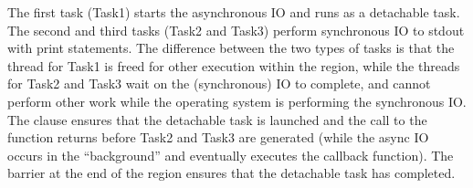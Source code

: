 The first task (Task1) starts the asynchronous IO and runs as a detachable task.
The second and third tasks (Task2 and Task3) perform synchronous IO to stdout with print statements.
The difference between the two types of tasks is that the thread for Task1 is freed for 
other execution within the  region, while the threads for Task2 and Task3 wait
on the (synchronous) IO to complete, and cannot perform other work while the 
operating system is performing the synchronous IO. 
The  clause ensures that the detachable task is launched 
and the call to the  function returns
before Task2 and Task3 are generated (while the async IO occurs in the ``background'' and eventually
executes the callback function).  The barrier at the end of the  region ensures that the
detachable task has completed.


